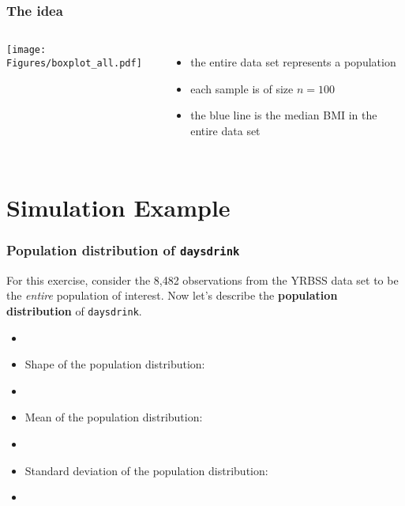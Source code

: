 \begin{frame}
\frametitle{The idea}
\begin{columns}
\texttt{[image: Figures/boxplot\_all.pdf]}
\begin{itemize}
\item the entire data set represents a population
\item each sample is of size $n=100$
\item the blue line is the median BMI in the entire data set
\end{itemize}
\end{columns}
\end{frame}



\section[Simulation]{Simulation Example}
\begin{frame}
\end{frame}

\begin{frame}
\frametitle{Population distribution of \texttt{days\textunderscore drink}}
For this exercise, consider the 8,482 observations from the YRBSS data set to be the \emph{entire} population of interest.  Now let's describe the \textbf{population distribution} of \texttt{days\textunderscore drink}.
\begin{itemize}
    \item[]
    \item
    Shape of the population distribution:
    \item[]
    \item
    Mean of the population distribution:
    \item[]
    \item
    Standard deviation of the population distribution:
    \item[]
\end{itemize}
\end{frame}

